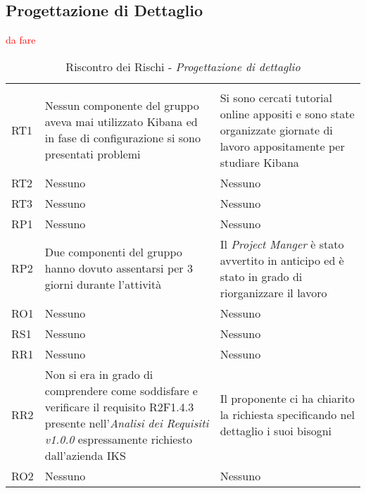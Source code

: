 \subsection{Progettazione di Dettaglio}
\textcolor{red}{da fare}
\label{sec:ProgettazioneDettaglioRischi}
\begin{table}[H]
	\centering
	\begin{tabular}{|C{2.5cm}|C{5cm}|C{5cm}|}
		 & & \\
		RT1  & Nessun componente del gruppo aveva mai utilizzato Kibana ed in fase di configurazione si sono presentati problemi & Si sono cercati tutorial online appositi e sono state organizzate giornate di lavoro appositamente per studiare Kibana \\
		\hline
		RT2  & Nessuno & Nessuno \\
		\hline
		RT3  & Nessuno & Nessuno \\
		\hline
		RP1  & Nessuno & Nessuno \\
		\hline
		RP2  & Due componenti del gruppo hanno dovuto assentarsi per 3 giorni durante l'attività & Il \textit{Project Manger} è stato avvertito in anticipo ed è stato in grado di riorganizzare il lavoro \\
		\hline
		RO1  & Nessuno & Nessuno \\
		\hline
		RS1  & Nessuno & Nessuno \\
		\hline
		RR1  & Nessuno & Nessuno \\
		\hline
		RR2  & Non si era in grado di comprendere come soddisfare e verificare il requisito R2F1.4.3 presente nell'\textit{Analisi dei Requisiti v1.0.0} espressamente richiesto dall'azienda IKS & Il proponente ci ha chiarito la richiesta specificando nel dettaglio i suoi bisogni\\
		\hline
		RO2  & Nessuno & Nessuno \\
		\hline
	\end{tabular}
	\caption{Riscontro dei Rischi - \textit{Progettazione di dettaglio}}
\end{table}



